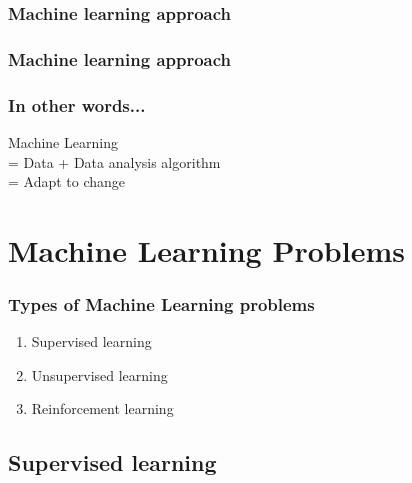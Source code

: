 \documentclass[]{beamer}
\begin{document}
\subsubsection{Machine learning approach}

\begin{frame}
	\frametitle{Machine learning approach}
	\begin{center}
	\end{center}
\end{frame}

\begin{frame}
	\frametitle{In other words...}
	\begin{center}
		Machine Learning \\
		\onslide<2-> \huge = Data + Data analysis algorithm \\
		\onslide<3-> \Huge = Adapt to change
	\end{center}
\end{frame}

\section{Machine Learning Problems}

\begin{frame}
	\frametitle{Types of Machine Learning problems}
	\begin{enumerate}
		\item<2-> Supervised learning
		\item<3-> Unsupervised learning
		\item<4-> Reinforcement learning
	\end{enumerate}
\end{frame}

\subsection{Supervised learning}
\end{document}

